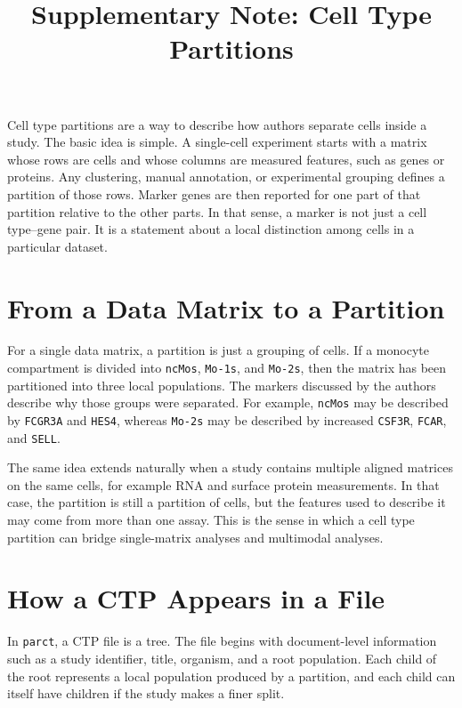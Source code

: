 \documentclass{article}
\begin{document}
\title{\textbf{Supplementary Note}: Cell Type Partitions}
\maketitle

Cell type partitions are a way to describe how authors separate cells inside a study. The basic idea is simple. A single-cell experiment starts with a matrix whose rows are cells and whose columns are measured features, such as genes or proteins. Any clustering, manual annotation, or experimental grouping defines a partition of those rows. Marker genes are then reported for one part of that partition relative to the other parts. In that sense, a marker is not just a cell type--gene pair. It is a statement about a local distinction among cells in a particular dataset.

\section{From a Data Matrix to a Partition}
For a single data matrix, a partition is just a grouping of cells. If a monocyte compartment is divided into \texttt{ncMos}, \texttt{Mo-1s}, and \texttt{Mo-2s}, then the matrix has been partitioned into three local populations. The markers discussed by the authors describe why those groups were separated. For example, \texttt{ncMos} may be described by \texttt{FCGR3A} and \texttt{HES4}, whereas \texttt{Mo-2s} may be described by increased \texttt{CSF3R}, \texttt{FCAR}, and \texttt{SELL}.

The same idea extends naturally when a study contains multiple aligned matrices on the same cells, for example RNA and surface protein measurements. In that case, the partition is still a partition of cells, but the features used to describe it may come from more than one assay. This is the sense in which a cell type partition can bridge single-matrix analyses and multimodal analyses.

\section{How a CTP Appears in a File}
In \texttt{parct}, a CTP file is a tree. The file begins with document-level information such as a study identifier, title, organism, and a root population. Each child of the root represents a local population produced by a partition, and each child can itself have children if the study makes a finer split.
\end{document}

